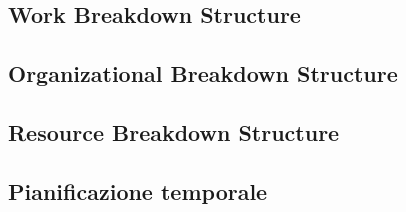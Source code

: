 \subsection{Work Breakdown Structure}


\subsection{Organizational Breakdown Structure}


\subsection{Resource Breakdown Structure}


\subsection{Pianificazione temporale}
